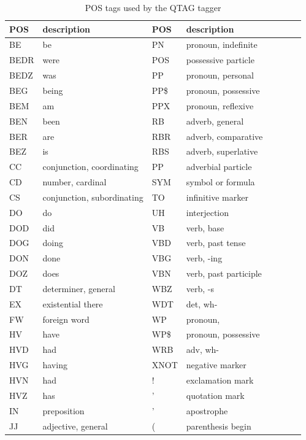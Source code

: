 \begin{table}[htbp]
\scriptsize
\caption{POS tags used by the QTAG tagger}
\begin{tabular} {|lp{4cm}|lp{4cm}|lp{8cm}|lp{0cm}|} %
\hline
\textbf{POS } & \textbf{description } & \textbf{POS } & \textbf{description } \\ \hline
BE & be & PN & pronoun, indefinite \\ \hline
BEDR & were & POS  & possessive particle \\ \hline
BEDZ & was & PP & pronoun, personal \\ \hline
BEG & being & PP\$ & pronoun, possessive \\ \hline
BEM & am & PPX & pronoun, reflexive \\ \hline
BEN & been & RB & adverb, general \\ \hline
BER & are & RBR & adverb, comparative \\ \hline
BEZ & is & RBS & adverb, superlative \\ \hline
CC & conjunction, coordinating & PP & adverbial particle \\ \hline
CD & number, cardinal & SYM & symbol or formula \\ \hline
CS & conjunction, subordinating & TO & infinitive marker \\ \hline
DO & do & UH & interjection \\ \hline
DOD & did & VB & verb, base \\ \hline
DOG & doing & VBD & verb, past tense \\ \hline
DON & done & VBG & verb, -ing \\ \hline
DOZ & does & VBN & verb, past participle \\ \hline
DT & determiner, general & WBZ & verb, -s \\ \hline
EX & existential there & WDT & det, wh- \\ \hline
FW & foreign word & WP & pronoun, \\ \hline
HV & have & WP\$ & pronoun, possessive \\ \hline
HVD & had & WRB & adv, wh- \\ \hline
HVG & having & XNOT & negative marker \\ \hline
HVN & had & ! & exclamation mark \\ \hline
HVZ & has & ' & quotation mark \\ \hline
IN & preposition & ' & apostrophe \\ \hline
JJ & adjective, general & ( & parenthesis begin \\ \hline

\end{tabular}
\end{table}
